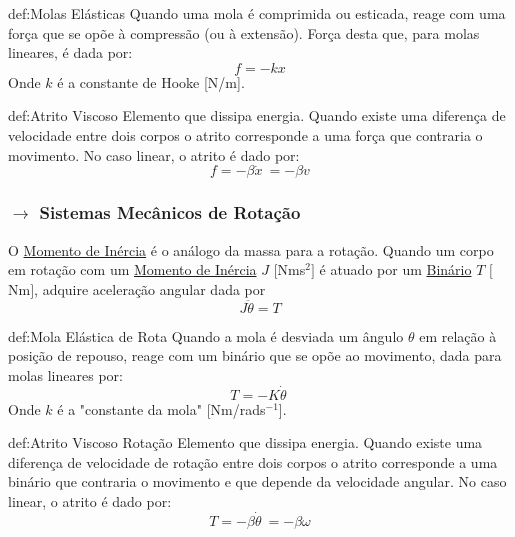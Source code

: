\renewcommand*{\thefootnote}{\arabic{footnote}}

\renewcommand*{\thefootnote}{\fnsymbol{footnote}}
\begin{theo}{def:Molas Elásticas}\label{def:MolasElásticas}
Quando uma mola é comprimida ou esticada, reage com uma força que se opõe à compressão (ou à extensão). Força desta que, para molas lineares, é dada por:
$$
    f = -kx
$$
Onde $k$ é a constante de Hooke [N/m].
\end{theo}

\begin{theo}{def:Atrito Viscoso}\label{def:AtritoViscoso}
Elemento que dissipa energia. Quando existe uma diferença de velocidade entre dois corpos o atrito corresponde a uma força que contraria o movimento. No caso linear, o atrito é dado por:
$$
    f = -\beta\dot{x}\ = -\beta v 
$$
\end{theo}

\subsubsection[2.2.2 Sistemas Mecânicos de Rotação]{$\pmb{\rightarrow}$ Sistemas Mecânicos de Rotação}
\label{sec:mechanics-rotation}

O \underline{Momento de Inércia} é o análogo da massa para a rotação. Quando um corpo em rotação com um \underline{Momento de Inércia} $J$ $[$Nms$^{2}]$ é atuado por um \underline{Binário} $T$ $[$Nm$]$, adquire aceleração angular dada por
$$
    \boxed{J\ddot{\theta} = T}
$$

\vspace{-1em}
\begin{theo}{def:Mola Elástica de Rota}\label{def:MolaElasticaRota}
Quando a mola é desviada um ângulo $\theta$  em relação à posição de repouso, reage
com um binário que se opõe ao movimento, dada para molas lineares por:
$$
    T = -K\dot{\theta}\ 
$$
Onde $k$ é a "constante da mola" [Nm/rads$^{-1}$].
\end{theo}

\begin{theo}{def:Atrito Viscoso Rotação}\label{def:AtritoViscosoRotação}
Elemento que dissipa energia. Quando existe uma diferença de velocidade de rotação entre dois corpos o atrito corresponde a uma binário que contraria o movimento e que depende da velocidade angular. No caso linear, o atrito é dado por:
$$
    T = -\beta\dot{\theta}\ = -\beta \omega
$$
\end{theo}

